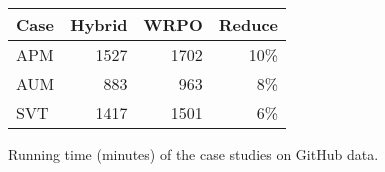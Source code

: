 \begin{figure}
\centering
\scriptsize
\setlength{\tabcolsep}{4pt}
\begin{tabular}{lrrr}
\toprule
Case & Hybrid & WRPO & Reduce \\
\midrule
APM & 1527 & 1702 & 10\% \\
AUM & 883 & 963 & 8\% \\
SVT & 1417 & 1501 & 6\% \\
\bottomrule
\end{tabular}%
\caption{Running time (minutes) of the case studies on GitHub data.}
\label{fig:case-study-table}
\end{figure}